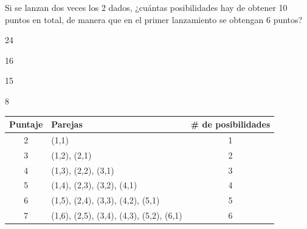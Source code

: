 \documentclass[letterpaper,fleqn]{article}
\begin{document}
\begin{enumerate}
\begin{minipage}{.35\textwidth}
Si se lanzan dos veces los 2 dados, ¿cuántas posibilidades hay de obtener 10 puntos en total, de manera que en el primer lanzamiento se obtengan 6 puntos?
\begin{enumerate}
\begin{multicols}{2}
\item 24
\item 16
\item 15
\item 8
\end{multicols}
\end{enumerate}
 \end{minipage}
 \begin{minipage}{.6\textwidth}
\begin{center}
\begin{tabular}{|c|l|c|}
\hline 
\textbf{Puntaje} & \qquad \textbf{Parejas} & \textbf{\# de posibilidades}\\ \hline
2 & (1,1) & \hspace*{1cm}1 \\ 
\hline 
3 & (1,2), (2,1) & \hspace*{1cm}2 \\ 
\hline 
4 & (1,3), (2,2), (3,1) & \hspace*{1cm}3 \\ 
\hline 
5 & (1,4), (2,3), (3,2), (4,1) & \hspace*{1cm}4 \\ 
\hline 
6 & (1,5), (2,4), (3,3), (4,2), (5,1) & \hspace*{1cm}5 \\ 
\hline 
7 & (1,6), (2,5), (3,4), (4,3), (5,2), (6,1) & \hspace*{1cm}6 \\ 
\hline 
\end{tabular} 
\end{center} 
 \end{minipage}
 \end{enumerate}
\end{document}
